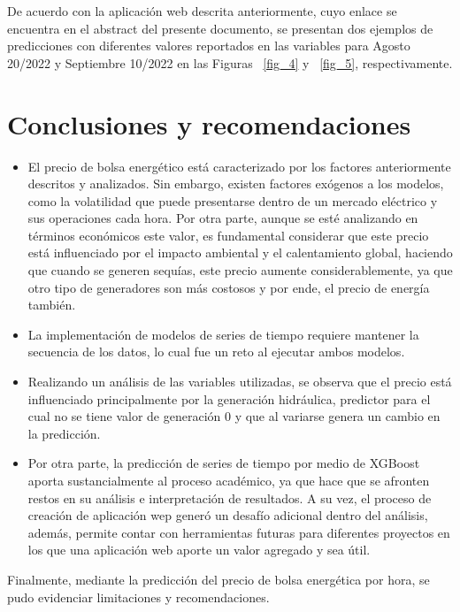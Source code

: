 \documentclass[conference, 10pt]{IEEEtran}
\begin{document}
De acuerdo con la aplicación web descrita anteriormente, cuyo enlace se encuentra en el abstract del presente documento, se presentan dos ejemplos de predicciones con diferentes valores reportados en las variables para Agosto 20/2022 y Septiembre 10/2022 en las Figuras ~\ref{fig_4}  y ~\ref{fig_5}, respectivamente.




\section{Conclusiones y recomendaciones}

\begin{itemize}
\item El precio de bolsa energético está caracterizado por los factores anteriormente descritos y analizados. Sin embargo, existen factores exógenos a los modelos, como la volatilidad que puede presentarse dentro de un mercado eléctrico y sus operaciones cada hora. Por otra parte, aunque se esté analizando en términos económicos este valor, es fundamental considerar que este precio está influenciado por el impacto ambiental y el calentamiento global, haciendo que cuando se generen sequías, este precio aumente considerablemente, ya que otro tipo de generadores son más costosos y por ende, el precio de energía también.
\item La implementación de modelos de series de tiempo requiere mantener la secuencia de los datos, lo cual fue un reto al ejecutar ambos modelos.
\item Realizando un análisis de las variables utilizadas, se observa que el precio está influenciado principalmente por la generación hidráulica, predictor para el cual no se tiene valor de generación 0 y que al variarse genera un cambio en la predicción.
\item Por otra parte, la predicción de series de tiempo por medio de XGBoost aporta sustancialmente al proceso académico, ya que hace que se afronten restos en su análisis e interpretación de resultados. A su vez, el proceso de creación de aplicación wep generó un desafío adicional dentro del análisis, además, permite contar con herramientas futuras para diferentes proyectos en los que una aplicación web aporte un valor agregado y sea útil.
 
\end{itemize}

Finalmente, mediante la predicción del precio de bolsa energética por hora, se pudo evidenciar limitaciones y recomendaciones.
\end{document}
